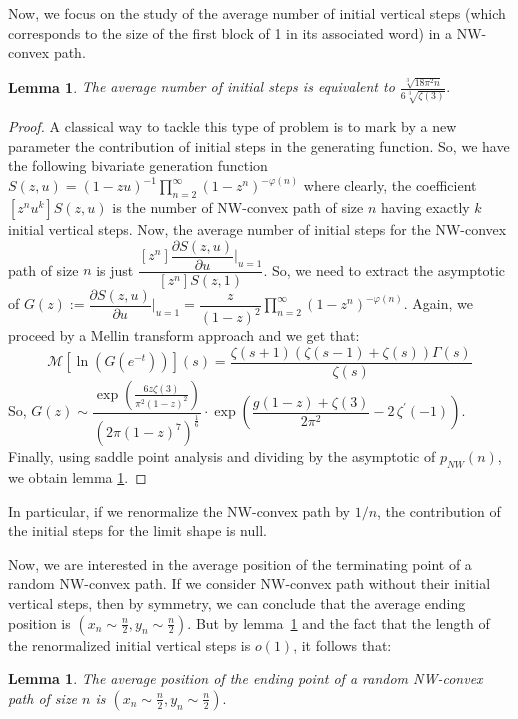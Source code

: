\documentclass{article}
\def\cM{\mathcal{M}}
\newtheorem{lemma}[theorem]{Lemma}
\begin{document}
Now, we focus on the study of the average number of initial vertical steps 
(which corresponds to the size of the first block of 1 in its associated word) in a NW-convex path. 
\begin{lemma}\label{init}
 The average number of initial steps is equivalent to ${\frac {\sqrt [3]{18{\pi }^{2}n}}{6\sqrt [3]{
\zeta  \left( 3 \right) }}}.$
\end{lemma}
\begin{proof}
 A classical way to tackle this type of problem is to mark by a new parameter the contribution of initial steps in the generating function. So, we have the following bivariate generation function $S(z,u)=(1-zu)^{-1}\prod\limits_{n=2}^{\infty}
(1-z^{n})^{-\varphi(n)}$ where clearly, the coefficient $[z^nu^k]S(z,u)$ is the number of NW-convex path of size $n$ having exactly $k$ initial vertical steps. Now, the average number of initial steps for the NW-convex path of size $n$ is just $\dfrac{[z^n]\dfrac{\partial S(z,u)}{\partial u}|_{u=1}}{[z^n]S(z,1)}$. 
So, we need to extract the asymptotic of $G(z):=\dfrac{\partial S(z,u)}{\partial u}|_{u=1}=\dfrac{z}{(1-z)^{2}}\prod\limits_{n=2}^{\infty}(1-z^{n})^{-\varphi(n)}$. Again, we proceed by a Mellin transform approach and we get that:
 $$\cM[\ln(G(e^{-t}))](s)={\frac {\zeta  \left( s+1 \right) (\zeta  \left( s-1 \right)+ \zeta  \left( s \right))\Gamma
 \left( s \right) }{\zeta  \left( s \right) }}$$
 So, $G(z)\sim \dfrac{\exp\left({\frac {6z\zeta  \left( 3 \right) }{{\pi }^{2} \left( 1-z \right) ^{2
}}}\right)}{ \left(2\pi(1-z)^7\right)^{\frac{1}{6}}}\cdot \exp\left(
{\dfrac {g(1-z)+\zeta  \left( 3 \right) }{2{\pi
}^{2}}}-2\,\zeta^\prime \left(-1 \right)\right ).$
Finally, using saddle point analysis and dividing by the asymptotic of $p_{NW}(n)$, we obtain lemma \ref{init}.

\end{proof}

In particular, if we renormalize the NW-convex path by $1/n$, the contribution of the initial steps for the limit shape is null.


Now, we are interested in the average position of the terminating point of a random NW-convex path.
 If we consider NW-convex path without their initial vertical steps, then by symmetry,
 we can conclude that the average ending position is $(x_n\sim\frac{n}{2},y_n\sim\frac{n}{2})$. 
But by lemma~\ref{init} and the fact that the length of the renormalized initial vertical steps is $o(1)$, it follows that:
\begin{lemma}\label{end}
 The average position of the ending point of a random NW-convex path of size $n$ is $(x_n\sim\frac{n}{2},y_n\sim\frac{n}{2}).$
\end{lemma} 
\end{document}
